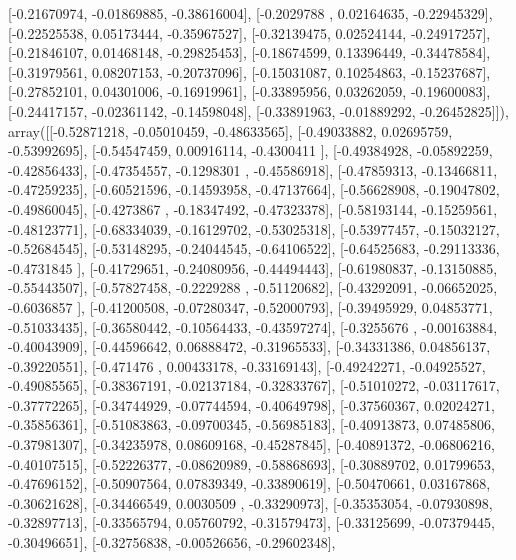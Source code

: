 \documentclass{article}
\begin{document}
       [-0.21670974, -0.01869885, -0.38616004],
       [-0.2029788 ,  0.02164635, -0.22945329],
       [-0.22525538,  0.05173444, -0.35967527],
       [-0.32139475,  0.02524144, -0.24917257],
       [-0.21846107,  0.01468148, -0.29825453],
       [-0.18674599,  0.13396449, -0.34478584],
       [-0.31979561,  0.08207153, -0.20737096],
       [-0.15031087,  0.10254863, -0.15237687],
       [-0.27852101,  0.04301006, -0.16919961],
       [-0.33895956,  0.03262059, -0.19600083],
       [-0.24417157, -0.02361142, -0.14598048],
       [-0.33891963, -0.01889292, -0.26452825]]), array([[-0.52871218, -0.05010459, -0.48633565],
       [-0.49033882,  0.02695759, -0.53992695],
       [-0.54547459,  0.00916114, -0.4300411 ],
       [-0.49384928, -0.05892259, -0.42856433],
       [-0.47354557, -0.1298301 , -0.45586918],
       [-0.47859313, -0.13466811, -0.47259235],
       [-0.60521596, -0.14593958, -0.47137664],
       [-0.56628908, -0.19047802, -0.49860045],
       [-0.4273867 , -0.18347492, -0.47323378],
       [-0.58193144, -0.15259561, -0.48123771],
       [-0.68334039, -0.16129702, -0.53025318],
       [-0.53977457, -0.15032127, -0.52684545],
       [-0.53148295, -0.24044545, -0.64106522],
       [-0.64525683, -0.29113336, -0.4731845 ],
       [-0.41729651, -0.24080956, -0.44494443],
       [-0.61980837, -0.13150885, -0.55443507],
       [-0.57827458, -0.2229288 , -0.51120682],
       [-0.43292091, -0.06652025, -0.6036857 ],
       [-0.41200508, -0.07280347, -0.52000793],
       [-0.39495929,  0.04853771, -0.51033435],
       [-0.36580442, -0.10564433, -0.43597274],
       [-0.3255676 , -0.00163884, -0.40043909],
       [-0.44596642,  0.06888472, -0.31965533],
       [-0.34331386,  0.04856137, -0.39220551],
       [-0.471476  ,  0.00433178, -0.33169143],
       [-0.49242271, -0.04925527, -0.49085565],
       [-0.38367191, -0.02137184, -0.32833767],
       [-0.51010272, -0.03117617, -0.37772265],
       [-0.34744929, -0.07744594, -0.40649798],
       [-0.37560367,  0.02024271, -0.35856361],
       [-0.51083863, -0.09700345, -0.56985183],
       [-0.40913873,  0.07485806, -0.37981307],
       [-0.34235978,  0.08609168, -0.45287845],
       [-0.40891372, -0.06806216, -0.40107515],
       [-0.52226377, -0.08620989, -0.58868693],
       [-0.30889702,  0.01799653, -0.47696152],
       [-0.50907564,  0.07839349, -0.33890619],
       [-0.50470661,  0.03167868, -0.30621628],
       [-0.34466549,  0.0030509 , -0.33290973],
       [-0.35353054, -0.07930898, -0.32897713],
       [-0.33565794,  0.05760792, -0.31579473],
       [-0.33125699, -0.07379445, -0.30496651],
       [-0.32756838, -0.00526656, -0.29602348],
\end{document}
